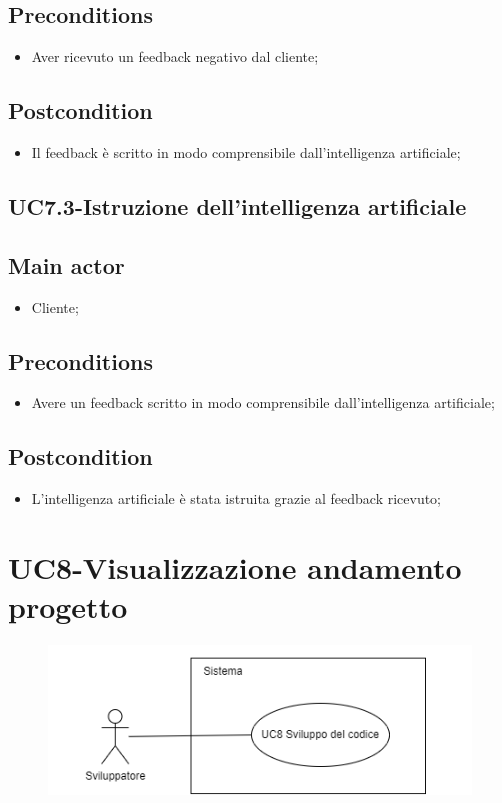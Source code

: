 \documentclass{article}
\begin{document}
     \subsection*{Preconditions} 
        \begin{itemize}
            \item Aver ricevuto un feedback negativo dal cliente;
        \end{itemize}
        \subsection*{Postcondition} 
        \begin{itemize}
            \item Il feedback è scritto in modo comprensibile dall'intelligenza artificiale;
        \end{itemize}
\subsection{UC7.3-Istruzione dell'intelligenza artificiale}
    
     \subsection*{Main actor}
         \begin{itemize}
             \item Cliente;
         \end{itemize}
     \subsection*{Preconditions} 
        \begin{itemize}
            \item Avere un feedback scritto in modo comprensibile dall'intelligenza artificiale;
        \end{itemize}
        \subsection*{Postcondition} 
        \begin{itemize}
            \item L'intelligenza artificiale è stata istruita grazie al feedback ricevuto;
        \end{itemize}

\section{UC8-Visualizzazione andamento progetto}
    \begin{figure}[h]
      \centering
      \includegraphics{./imgUML/UC8.png}
      \label{fig:immagine}
    \end{figure}
    
\end{document}

